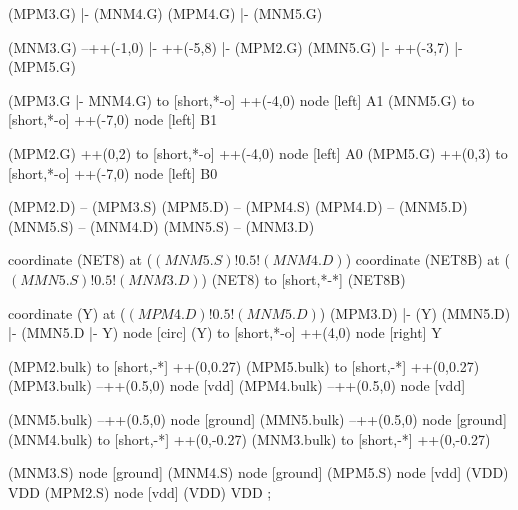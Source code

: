 \begin{circuitikz}[american]
	(MPM3.G) |- (MNM4.G)
	(MPM4.G) |- (MNM5.G)
	
	(MNM3.G) --++(-1,0) |- ++(-5,8) |- (MPM2.G)
	(MMN5.G) |- ++(-3,7) |- (MPM5.G)
	
	(MPM3.G |- MNM4.G) to [short,*-o] ++(-4,0) node [left] {A1}
	(MNM5.G) to [short,*-o] ++(-7,0) node [left] {B1}
	
	(MPM2.G) ++(0,2) to [short,*-o] ++(-4,0) node [left] {A0}
	(MPM5.G) ++(0,3) to [short,*-o] ++(-7,0) node [left] {B0}
	
	(MPM2.D) -- (MPM3.S)
	(MPM5.D) -- (MPM4.S)
	(MPM4.D) -- (MNM5.D)
	(MNM5.S) -- (MNM4.D)
	(MMN5.S) -- (MNM3.D)
	
	coordinate (NET8) at ($(MNM5.S)!0.5!(MNM4.D)$)
	coordinate (NET8B) at ($(MMN5.S)!0.5!(MNM3.D)$)
	(NET8) to [short,*-*] (NET8B)
	
	coordinate (Y) at ($(MPM4.D)!0.5!(MNM5.D)$)
	(MPM3.D) |- (Y)
	(MMN5.D) |- (MMN5.D |- Y) node [circ] {}
	(Y) to [short,*-o] ++(4,0) node [right] {Y}
	
	(MPM2.bulk) to [short,-*] ++(0,0.27)
	(MPM5.bulk) to [short,-*] ++(0,0.27)
	(MPM3.bulk) --++(0.5,0) node [vdd]{}
	(MPM4.bulk) --++(0.5,0) node [vdd]{}
	
	(MNM5.bulk) --++(0.5,0) node [ground]{}
	(MMN5.bulk) --++(0.5,0) node [ground]{}
	(MNM4.bulk) to [short,-*] ++(0,-0.27)	
	(MNM3.bulk) to [short,-*] ++(0,-0.27)
	

	(MNM3.S) node [ground] {}
	(MNM4.S) node [ground] {}
	(MPM5.S) node [vdd] (VDD) {VDD}
	(MPM2.S) node [vdd] (VDD) {VDD}
;

\end{circuitikz}
